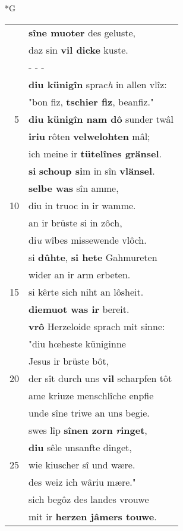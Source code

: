 \documentclass[8pt,a4paper,notitlepage]{article}
\begin{document}
\begin{table}[ht]
\begin{minipage}[t]{0.5\linewidth}
\small
\begin{center}*G
\end{center}
\begin{tabular}{rl}
 & \textbf{sîne muoter} des geluste,\\ 
 & daz sin \textbf{vil dicke} kuste.\\ 
 & \multicolumn{1}{l}{ - - - }\\ 
 & \textbf{diu künigîn} sprac\textit{h} in allen vlîz:\\ 
 & "bon fiz, \textbf{tschier fiz}, beanfiz."\\ 
5 & \textbf{diu künigîn nam dô} sunder twâl\\ 
 & \textbf{iriu} rôten \textbf{velwelohten} mâl;\\ 
 & ich meine ir \textbf{tütelînes gränsel}.\\ 
 & \textbf{si} \textbf{schoup si}m in sîn \textbf{vlänsel}.\\ 
 & \textbf{selbe was} sîn amme,\\ 
10 & diu in truoc in ir wamme.\\ 
 & an ir brüste si in zôch,\\ 
 & di\textit{u} wîbes missewende vlôch.\\ 
 & si \textbf{dûhte}, \textbf{si hete} Gahmureten\\ 
 & wider an ir arm erbeten.\\ 
15 & si kêrte sich niht an lôsheit.\\ 
 & \textbf{diemuot was ir} bereit.\\ 
 & \textbf{vrô} Herzeloide sprach mit sinne:\\ 
 & "diu hœheste küniginne\\ 
 & Jesus ir brüste bôt,\\ 
20 & der sît durch uns \textbf{vil} scharpfen tôt\\ 
 & ame kriuze menschlîche enpfie\\ 
 & unde sîne triwe an uns begie.\\ 
 & swes lîp \textbf{sînen zorn} \textbf{\textit{r}inget},\\ 
 & \textbf{diu} sêle unsanfte dinget,\\ 
25 & wie kiuscher sî und wære.\\ 
 & des weiz ich wâriu mære."\\ 
 & sich begôz des landes vrouwe\\ 
 & mit ir \textbf{herzen jâmers touwe}.\\ 

\end{tabular}
\end{minipage}
\end{table}
\end{document}

